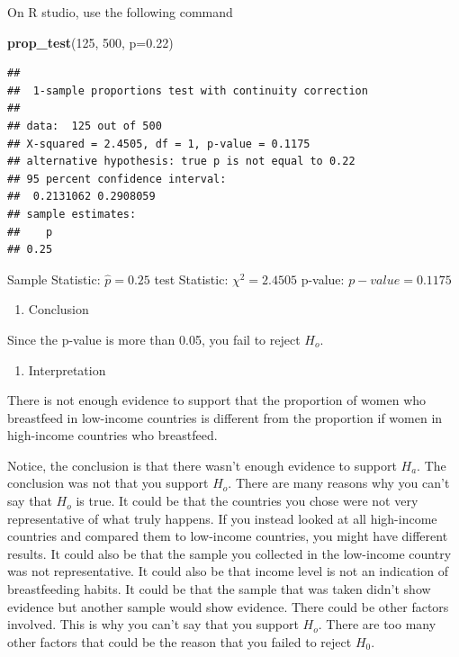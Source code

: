 \documentclass[]{book}
\newenvironment{Shaded}{\begin{snugshade}}{\end{snugshade}}
\newcommand{\DataTypeTok}[1]{\textcolor[rgb]{0.13,0.29,0.53}{#1}}
\newcommand{\DecValTok}[1]{\textcolor[rgb]{0.00,0.00,0.81}{#1}}
\newcommand{\FloatTok}[1]{\textcolor[rgb]{0.00,0.00,0.81}{#1}}
\newcommand{\KeywordTok}[1]{\textcolor[rgb]{0.13,0.29,0.53}{\textbf{#1}}}
\newcommand{\NormalTok}[1]{#1}
\providecommand{\tightlist}{%
  \setlength{\itemsep}{0pt}\setlength{\parskip}{0pt}}
\begin{document}
On R studio, use the following command

\begin{Shaded}
\begin{Highlighting}[]
\KeywordTok{prop_test}\NormalTok{(}\DecValTok{125}\NormalTok{, }\DecValTok{500}\NormalTok{, }\DataTypeTok{p=}\FloatTok{0.22}\NormalTok{)}
\end{Highlighting}
\end{Shaded}

\begin{verbatim}
## 
##  1-sample proportions test with continuity correction
## 
## data:  125 out of 500
## X-squared = 2.4505, df = 1, p-value = 0.1175
## alternative hypothesis: true p is not equal to 0.22
## 95 percent confidence interval:
##  0.2131062 0.2908059
## sample estimates:
##    p 
## 0.25
\end{verbatim}

Sample Statistic: \(\hat{p}=0.25\)
test Statistic: \(\chi^2=2.4505\)
p-value: \(p-value=0.1175\)

\begin{enumerate}
\def\labelenumi{\arabic{enumi}.}
\setcounter{enumi}{4}
\tightlist
\item
  Conclusion
\end{enumerate}

Since the p-value is more than 0.05, you fail to reject \(H_o\).

\begin{enumerate}
\def\labelenumi{\arabic{enumi}.}
\setcounter{enumi}{5}
\tightlist
\item
  Interpretation
\end{enumerate}

There is not enough evidence to support that the proportion of women who breastfeed in low-income countries is different from the proportion if women in high-income countries who breastfeed.

Notice, the conclusion is that there wasn't enough evidence to support \(H_a\). The conclusion was not that you support \(H_o\). There are many reasons why you can't say that \(H_o\) is true. It could be that the countries you chose were not very representative of what truly happens. If you instead looked at all high-income countries and compared them to low-income countries, you might have different results. It could also be that the sample you collected in the low-income country was not representative. It could also be that income level is not an indication of breastfeeding habits. It could be that the sample that was taken didn't show evidence but another sample would show evidence. There could be other factors involved. This is why you can't say that you support \(H_o\). There are too many other factors that could be the reason that you failed to reject \(H_0\).
\end{document}
